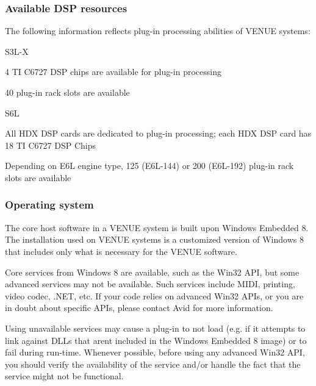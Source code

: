 \hypertarget{a00377_aax_venue_guide__environment__dsp_resources}{}\subsubsection{Available D\+S\+P resources}\label{a00377_aax_venue_guide__environment__dsp_resources}
 The following information reflects plug-\/in processing abilities of V\+E\+N\+U\+E systems\+: 
\begin{DoxyItemize}
\item S3\+L-\/\+X 
\begin{DoxyItemize}
\item 4 T\+I C6727 D\+S\+P chips are available for plug-\/in processing 
\item 40 plug-\/in rack slots are available 
\end{DoxyItemize}
\item S6\+L 
\begin{DoxyItemize}
\item All H\+D\+X D\+S\+P cards are dedicated to plug-\/in processing; each H\+D\+X D\+S\+P card has 18 T\+I C6727 D\+S\+P Chips 
\item Depending on E6\+L engine type, 125 (E6\+L-\/144) or 200 (E6\+L-\/192) plug-\/in rack slots are available 
\end{DoxyItemize}
\end{DoxyItemize}

\hypertarget{a00377_aax_venue_guide__environment__operating_system}{}\subsubsection{Operating system}\label{a00377_aax_venue_guide__environment__operating_system}
 The core host software in a V\+E\+N\+U\+E system is built upon Windows Embedded 8. The installation used on V\+E\+N\+U\+E systems is a customized version of Windows 8 that includes only what is necessary for the V\+E\+N\+U\+E software.

 Core services from Windows 8 are available, such as the Win32 A\+P\+I, but some advanced services may not be available. Such services include M\+I\+D\+I, printing, video codec, .N\+E\+T, etc. If your code relies on advanced Win32 A\+P\+Is, or you are in doubt about specific A\+P\+Is, please contact Avid for more information.

 Using unavailable services may cause a plug-\/in to not load (e.\+g. if it attempts to link against D\+L\+Ls that aren\textquotesingle{}t included in the Windows Embedded 8 image) or to fail during run-\/time. Whenever possible, before using any advanced Win32 A\+P\+I, you should verify the availability of the service and/or handle the fact that the service might not be functional.

